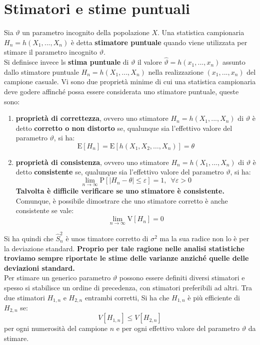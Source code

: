 \documentclass[a4paper,12pt, oneside]{book}
\begin{document}
\section{Stimatori e stime puntuali}
Sia $\vartheta$ un parametro incognito della popolazione $X$.
Una statistica campionaria $H_n=h(X_1,...,X_n)$ è detta \textbf{stimatore puntuale} quando viene utilizzata per stimare il parametro incognito $\vartheta$.\\
Si definisce invece ls \textbf{stima puntuale} di $\vartheta$ il valore $\hat{\vartheta}=h(x_1,...,x_n)$ assunto dallo stimatore puntuale $H_n=h(X_1,...,X_n)$ nella realizzazione $(x_1,...,x_n)$ del campione casuale.
\newpage
Vi sono due proprietà minime di cui una statistica campionaria deve godere
affinché possa essere considerata uno stimatore puntuale, queste sono:
\begin{enumerate}
\item \textbf{proprietà di correttezza}, ovvero uno stimatore $H_n=h(X_1,...,X_n)$ di $\vartheta$ è detto \textbf{corretto o non distorto} se, qualunque sia l’effettivo valore del parametro $\vartheta$, si ha:
  \[\mathrm{E}\left[H_{n}\right]=\mathrm{E}\left[h\left(X_{1}, X_{2}, \ldots, X_{n}\right)\right]=\theta\]
\item \textbf{proprietà di consistenza}, ovvero uno stimatore $H_n=h(X_1,...,X_n)$ di $\vartheta$ è detto \textbf{consistente} se, qualunque sia l’effettivo valore del parametro $\vartheta$, si ha:
  \[\lim _{n \rightarrow \infty} \mathrm{P}\left[|H_{n}-\theta | \leq \varepsilon\right]=1,\,\,\, \forall \varepsilon > 0\]
  \textbf{Talvolta è difficile verificare se uno stimatore è consistente.}\\
  Comunque, è possibile dimostrare che uno stimatore corretto è anche consistente se vale:
  \[\lim _{n \rightarrow \infty} \mathrm{V}\left[H_{n}\right]=0\]
\end{enumerate}
Si ha quindi che $\hat{S}_n^2$ è unos timatore corretto di $\sigma^2$ ma la sua radice non lo è per la deviazione standard. \textbf{Proprio per tale ragione nelle analisi statistiche troviamo sempre riportate le stime
  delle varianze anziché quelle delle deviazioni standard.}\\
Per stimare un generico parametro $\vartheta$ possono essere definiti diversi stimatori e spesso si stabilisce un ordine di precedenza, con stimatori preferibili ad altri. Tra due stimatori $H_{1,n}$ e $H_{2,n}$ entrambi corretti, Si ha che $H_{1,n}$ è più efficiente di $H_{2,n}$ se:
\[V\left[H_{1, n}\right] \leq V\left[H_{2, n}\right]\]
per ogni numerosità del campione $n$ e per ogni effettivo valore del parametro
$\vartheta$ da stimare.
\end{document}
